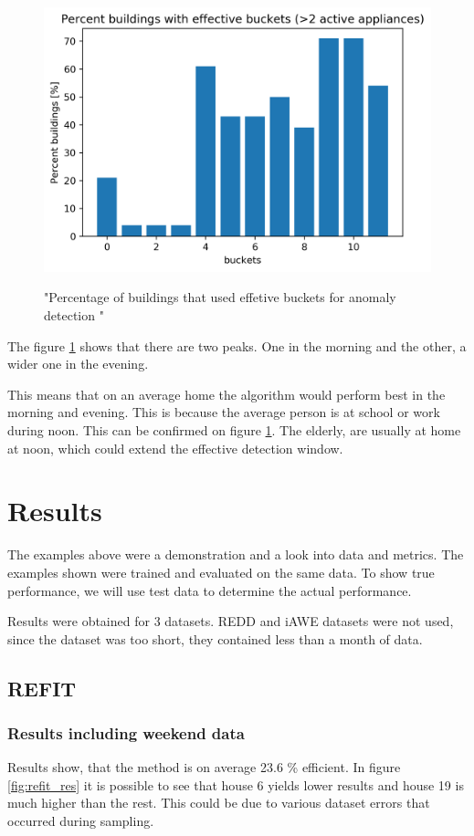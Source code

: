 \begin{figure}[H]
	\centering
	\caption{"Percentage of buildings that used effetive buckets for anomaly detection "}
	\includegraphics[width=.8\textwidth]{Figures/EC/all_ignored_buckets_dist_incl_act.png}
	\label{fig:ignored_buckets_act}
\end{figure}

The figure \ref{fig:ignored_buckets_act} shows that there are two peaks.
One in the morning and the other, a wider one in the evening.

This means that on an average home the algorithm would perform best in the morning and evening.
This is because the average person is at school or work during noon. 
This can be confirmed on figure \ref{fig:ignored_buckets_act}.
The elderly, are usually at home at noon, which could extend the effective detection window.

\section{Results}

The examples above were a demonstration and a look into data and metrics. 
The examples shown were trained and evaluated on the same data. 
To show true performance, we will use test data to determine the actual performance. 

Results were obtained for 3 datasets. 
REDD and iAWE datasets were not used, since the dataset was too short, they contained less than a month of data. 


\subsection{REFIT}

\subsubsection{Results including weekend data}
Results show, that the method is on average 23.6 \% efficient. 
In figure \ref{fig:refit_res} it is possible to see that house 6 yields lower results and house 19 is much higher than the rest. 
This could be due to various dataset errors that occurred during sampling.

